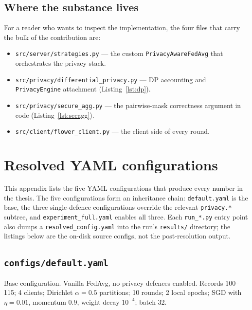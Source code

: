 \documentclass[11pt,a4paper]{report}
\begin{document}
\section{Where the substance lives}

For a reader who wants to inspect the implementation, the four files
that carry the bulk of the contribution are:

\begin{itemize}[leftmargin=*]
  \item \texttt{src/server/strategies.py} --- the custom
  \texttt{PrivacyAwareFedAvg} that orchestrates the privacy stack.
  \item \texttt{src/privacy/differential\_privacy.py} --- DP
  accounting and \texttt{PrivacyEngine} attachment (Listing~\ref{lst:dp}).
  \item \texttt{src/privacy/secure\_agg.py} --- the pairwise-mask
  correctness argument in code (Listing~\ref{lst:secagg}).
  \item \texttt{src/client/flower\_client.py} --- the client side of
  every round.
\end{itemize}

\chapter{Resolved YAML configurations}\label{app:configs}

This appendix lists the five YAML configurations that produce every
number in the thesis. The five configurations form an inheritance
chain: \texttt{default.yaml} is the base, the three single-defence
configurations override the relevant \texttt{privacy.*} subtree, and
\texttt{experiment\_full.yaml} enables all three. Each
\texttt{run\_*.py} entry point also dumps a \texttt{resolved\_config.yaml}
into the run's \texttt{results/} directory; the listings below are the
on-disk source configs, not the post-resolution output.

\section{\texttt{configs/default.yaml}}\label{app:cfg-default}

Base configuration. Vanilla FedAvg, no privacy defences enabled.
Records 100--115; 4 clients; Dirichlet $\alpha = 0.5$ partitions; 10
rounds; 2 local epochs; SGD with $\eta = 0.01$, momentum 0.9, weight
decay $10^{-4}$; batch 32.
\end{document}
